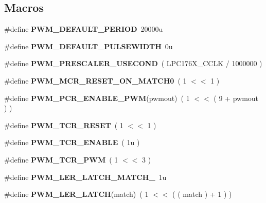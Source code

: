\subsection*{Macros}
\begin{DoxyCompactItemize}
\item 
\mbox{\label{pwmout-defs_8h_afbf4d8f125017e7ffa7feaddbf8eadea}} 
\#define {\bfseries P\+W\+M\+\_\+\+D\+E\+F\+A\+U\+L\+T\+\_\+\+P\+E\+R\+I\+OD}~20000u
\item 
\mbox{\label{pwmout-defs_8h_a442db1cb4022b6a07fb31081e37f2bb1}} 
\#define {\bfseries P\+W\+M\+\_\+\+D\+E\+F\+A\+U\+L\+T\+\_\+\+P\+U\+L\+S\+E\+W\+I\+D\+TH}~0u
\item 
\mbox{\label{pwmout-defs_8h_aeae248c4b2e671ffeac5dc688650dbc3}} 
\#define {\bfseries P\+W\+M\+\_\+\+P\+R\+E\+S\+C\+A\+L\+E\+R\+\_\+\+U\+S\+E\+C\+O\+ND}~( L\+P\+C176\+X\+\_\+\+C\+C\+LK / 1000000 )
\item 
\mbox{\label{pwmout-defs_8h_a0e9a2fe41ee72f92c255864975d99c8d}} 
\#define {\bfseries P\+W\+M\+\_\+\+M\+C\+R\+\_\+\+R\+E\+S\+E\+T\+\_\+\+O\+N\+\_\+\+M\+A\+T\+C\+H0}~( 1 $<$$<$ 1 )
\item 
\mbox{\label{pwmout-defs_8h_afda5385714713fb860391f14a0249bd7}} 
\#define {\bfseries P\+W\+M\+\_\+\+P\+C\+R\+\_\+\+E\+N\+A\+B\+L\+E\+\_\+\+P\+WM}(pwmout)~( 1 $<$$<$ ( 9 + pwmout ) )
\item 
\mbox{\label{pwmout-defs_8h_a2b0c810cf8493449996e79bec72fa02b}} 
\#define {\bfseries P\+W\+M\+\_\+\+T\+C\+R\+\_\+\+R\+E\+S\+ET}~( 1 $<$$<$ 1 )
\item 
\mbox{\label{pwmout-defs_8h_ab36b31d3b69a3ad58e9743e4bf111054}} 
\#define {\bfseries P\+W\+M\+\_\+\+T\+C\+R\+\_\+\+E\+N\+A\+B\+LE}~( 1u )
\item 
\mbox{\label{pwmout-defs_8h_aabddd314b70953c4eb9e63017f88e38a}} 
\#define {\bfseries P\+W\+M\+\_\+\+T\+C\+R\+\_\+\+P\+WM}~( 1 $<$$<$ 3 )
\item 
\mbox{\label{pwmout-defs_8h_a673d32d2fa5662689fe4accf5ff8b074}} 
\#define {\bfseries P\+W\+M\+\_\+\+L\+E\+R\+\_\+\+L\+A\+T\+C\+H\+\_\+\+M\+A\+T\+C\+H\+\_}~1u
\item 
\mbox{\label{pwmout-defs_8h_aa2540705c0ccfb91b3bffd989e7a12ab}} 
\#define {\bfseries P\+W\+M\+\_\+\+L\+E\+R\+\_\+\+L\+A\+T\+CH}(match)~( 1 $<$$<$ ( ( match ) + 1 ) )
\end{DoxyCompactItemize}

